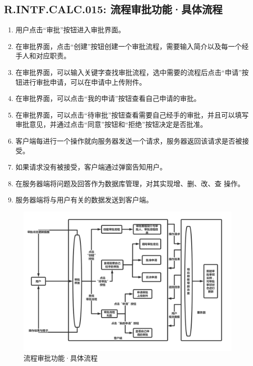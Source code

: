     {
        \color{red}
        \subsection{\color{red}R.INTF.CALC.015: 流程审批功能·具体流程}
            \begin{enumerate}
                \item 用户点击“审批”按钮进入审批界面。
                \item 在审批界面，点击“创建”按钮创建一个审批流程，需要输入简介以及每一个经手人和对应职责。
                \item 在审批界面，可以输入关键字查找审批流程，选中需要的流程后点击“申请”按钮进行审批申请，可以在申请中上传附件。
                \item 在审批界面，可以点击“我的申请”按钮查看自己申请的审批。
                \item 在审批界面，可以点击“待审批”按钮查看需要自己经手的审批，并且可以填写审批意见，并通过点击“同意”按钮和“拒绝”按钮决定是否批准。
                \item 客户端每进行一个操作就向服务器发送一个请求，服务器返回该请求是否被接受。
                \item 如果请求没有被接受，客户端通过弹窗告知用户。
                \item 在服务器端将问题及回答作为数据库管理，对其实现增、删、改、查 操作。
                \item 服务器端将与用户有关的数据发送到客户端。
            \end{enumerate}
        }
        \begin{figure}[h]
            \centering
            \includegraphics[scale=0.35]{OutlineDesign/figures/流程审批功能·具体流程.png}
            \caption{\color{red}流程审批功能·具体流程}
            \label{fig:server_flow}
        \end{figure}
